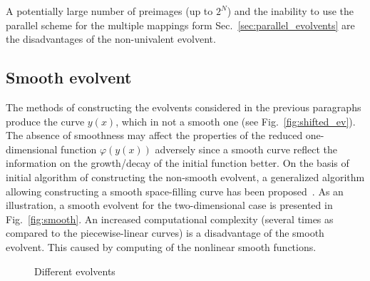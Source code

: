 \documentclass[runningheads]{llncs}
\begin{document}
A potentially large number of preimages (up to $2^N$) and the inability to use the parallel
scheme for the multiple mappings form Sec.~\ref{sec:parallel_evolvents} are the disadvantages
of the non-univalent evolvent.


\subsection{Smooth evolvent}

The methods of constructing the evolvents considered in the previous paragraphs produce the
curve $y(x)$, which in not a smooth one (see Fig.~\ref{fig:shifted_ev}). The absence of
smoothness may affect the properties of the reduced one-dimensional function $\varphi(y(x))$
adversely since a smooth curve reflect the information on the growth/decay of the initial
function better. On the basis of initial algorithm of constructing the non-smooth evolvent, a
generalized algorithm allowing constructing a smooth space-filling curve has been
proposed~\cite{Goryachih2017}. As an illustration, a smooth evolvent for the two-dimensional
case is presented in Fig.~\ref{fig:smooth}.
An increased computational complexity (several times as compared to the piecewise-linear
curves) is a disadvantage of the smooth evolvent. This caused by computing of the nonlinear smooth
functions.


\begin{figure}[ht]
    \centering
    \caption{Different evolvents}
\end{figure}
\end{document}
